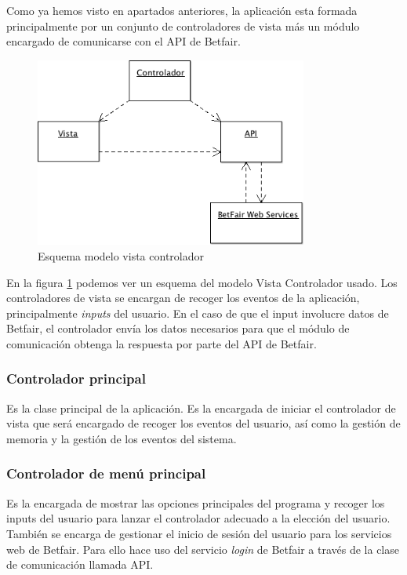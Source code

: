    Como ya hemos visto en apartados anteriores, la aplicación esta formada principalmente por un conjunto de controladores de vista más un módulo encargado de comunicarse con el API de Betfair. %
   
   \begin{figure} [h]
     \centering
     \includegraphics[width=0.8\textwidth]{./images/modelo1.png}
     \caption{Esquema modelo vista controlador }
     \label{fig:esquema-MVC}
   \end{figure}
   
    En la figura \ref{fig:esquema-MVC} podemos ver un esquema del modelo Vista Controlador usado. %
     Los controladores de vista se encargan de recoger los eventos de la aplicación, principalmente \emph{inputs} del usuario. %
     En el caso de que el input involucre datos de Betfair, el controlador envía los datos necesarios para que el módulo de comunicación obtenga la respuesta por parte del API de Betfair. 
    
\subsubsection{Controlador principal}

 Es la clase principal de la aplicación. Es la encargada de iniciar el controlador de vista que será encargado de recoger los eventos del usuario, así como la gestión de memoria y la gestión de los eventos del sistema.
 
\subsubsection{Controlador de menú principal}
 Es la encargada de mostrar las opciones principales del programa y recoger los inputs del usuario para lanzar el controlador adecuado a la elección del usuario. También se encarga de gestionar el inicio de sesión del usuario para los servicios web de Betfair. Para ello hace uso del servicio \emph{login} de Betfair a través de la clase de comunicación llamada API.
 
